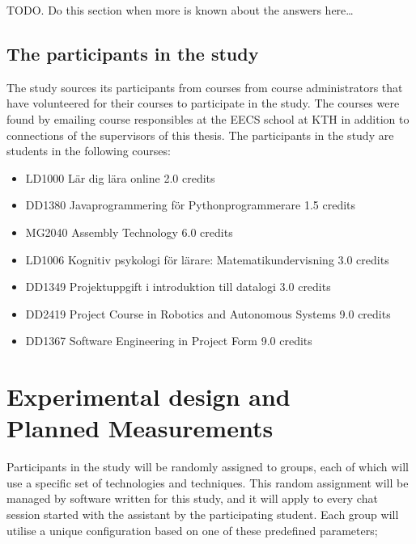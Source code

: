TODO. Do this section when more is known about the answers here…




\subsection{The participants in the study}


The study sources its participants from courses from course administrators that have volunteered for their courses to participate in the study. The courses were found by emailing course responsibles at the EECS school at KTH in addition to connections of the supervisors of this thesis. The participants in the study are students in the following courses:


\begin{itemize}
        \item LD1000 Lär dig lära online 2.0 credits
        \item DD1380 Javaprogrammering för Pythonprogrammerare 1.5 credits
        \item MG2040 Assembly Technology 6.0 credits
        \item LD1006 Kognitiv psykologi för lärare: Matematikundervisning 3.0 credits
        \item DD1349 Projektuppgift i introduktion till datalogi 3.0 credits
        \item DD2419 Project Course in Robotics and Autonomous Systems 9.0 credits
        \item DD1367 Software Engineering in Project Form 9.0 credits
\end{itemize}


\section[Experimental design/Planned Measurements]{Experimental design and\\Planned Measurements}
\label{sec:experimentalDesign}


Participants in the study will be randomly assigned to groups, each of which will use a specific set of technologies and techniques. This random assignment will be managed by software written for this study, and it will apply to every chat session started with the assistant by the participating student. Each group will utilise a unique configuration based on one of these predefined parameters;


